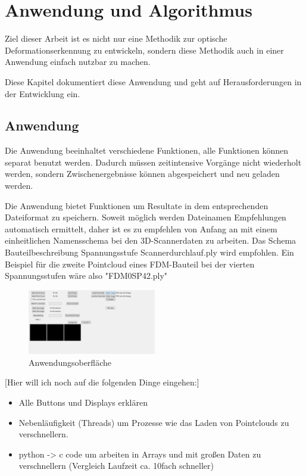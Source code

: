 
\chapter{Anwendung und Algorithmus}

Ziel dieser Arbeit ist es nicht nur eine Methodik zur optische 
Deformationserkennung zu entwickeln, sondern diese Methodik auch in einer 
Anwendung einfach nutzbar zu machen. 

Diese Kapitel dokumentiert diese Anwendung und geht auf Herausforderungen 
in der Entwicklung ein.

\section{Anwendung}

Die Anwendung beeinhaltet verschiedene Funktionen, alle Funktionen 
können separat benutzt werden. Dadurch müssen zeitintensive Vorgänge nicht 
wiederholt werden, sondern Zwischenergebnisse können abgespeichert und 
neu geladen werden. 

Die Anwendung bietet Funktionen um Resultate in dem entsprechenden Dateiformat zu 
speichern. Soweit möglich werden Dateinamen Empfehlungen automatisch ermittelt, 
daher ist es zu empfehlen von Anfang an mit einem einheitlichen Namensschema bei
den 3D-Scannerdaten zu arbeiten. 
Das Schema Bauteilbeschreibung \textunderscore Spannungsstufe 
\textunderscore Scannerdurchlauf.ply
wird empfohlen. Ein Beispiel für die zweite Pointcloud eines FDM-Bauteil bei der
vierten Spannungsstufen wäre also "FDM0\textunderscore SP4\textunderscore 2.ply"


\begin{figure}[H]
    \centering
    \includegraphics[width=0.5\textwidth]{images/software_screenshot.png}
    \caption{Anwendungsoberfläche}
    \label{fig:software_screenshot}
\end{figure}

[Hier will ich noch auf die folgenden Dinge eingehen:]

\begin{itemize}
    \item Alle Buttons und Displays erklären
    \item Nebenläufigkeit (Threads) um Prozesse wie das Laden von Pointclouds 
    zu verschnellern.
    \item  python -> c code um arbeiten in Arrays und mit großen Daten zu verschnellern
    (Vergleich Laufzeit ca. 10fach schneller)
\end{itemize}


